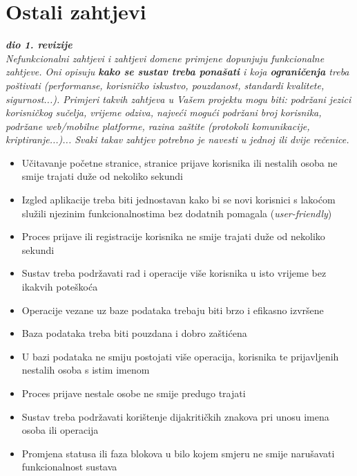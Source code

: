             	\eject
	
		\section{Ostali zahtjevi}
		
			\textbf{\textit{dio 1. revizije}}\\
		 
			 \textit{Nefunkcionalni zahtjevi i zahtjevi domene primjene dopunjuju funkcionalne zahtjeve. Oni opisuju \textbf{kako se sustav treba ponašati} i koja \textbf{ograničenja} treba poštivati (performanse, korisničko iskustvo, pouzdanost, standardi kvalitete, sigurnost...). Primjeri takvih zahtjeva u Vašem projektu mogu biti: podržani jezici korisničkog sučelja, vrijeme odziva, najveći mogući podržani broj korisnika, podržane web/mobilne platforme, razina zaštite (protokoli komunikacije, kriptiranje...)... Svaki takav zahtjev potrebno je navesti u jednoj ili dvije rečenice.}
			 
			 \begin{itemize}
			 	\item Učitavanje početne stranice, stranice prijave korisnika ili nestalih osoba ne smije trajati duže od nekoliko sekundi
			 	\item Izgled aplikacije treba biti jednostavan kako bi se novi korisnici s lakoćom služili njezinim funkcionalnostima bez dodatnih pomagala (\textit{user-friendly})
			 	\item Proces prijave ili registracije korisnika ne smije trajati duže od nekoliko sekundi
			 	\item Sustav treba podržavati rad i operacije više korisnika u isto vrijeme bez ikakvih poteškoća
			 	\item Operacije vezane uz baze podataka trebaju biti brzo i efikasno izvršene
			 	\item Baza podataka treba biti pouzdana i dobro zaštićena
			 	\item U bazi podataka ne smiju postojati više operacija, korisnika te prijavljenih nestalih osoba s istim imenom
			 	\item Proces prijave nestale osobe ne smije predugo trajati
			 	\item Sustav treba podržavati korištenje dijakritičkih znakova pri unosu imena osoba ili operacija
			 	\item Promjena statusa ili faza blokova u bilo kojem smjeru ne smije narušavati funkcionalnost sustava
			 \end{itemize}
			 
			 
			 
	
